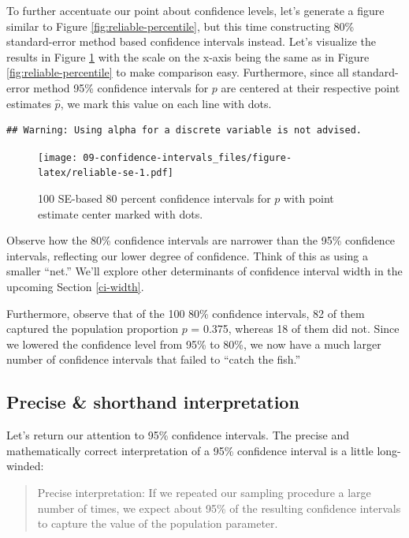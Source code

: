 \documentclass[
]{book}
\begin{document}
To further accentuate our point about confidence levels, let's generate a figure similar to Figure \ref{fig:reliable-percentile}, but this time constructing 80\% standard-error method based confidence intervals instead. Let's visualize the results in Figure \ref{fig:reliable-se} with the scale on the x-axis being the same as in Figure \ref{fig:reliable-percentile} to make comparison easy. Furthermore, since all standard-error method 95\% confidence intervals for \(p\) are centered at their respective point estimates \(\widehat{p}\), we mark this value on each line with dots.

\begin{verbatim}
## Warning: Using alpha for a discrete variable is not advised.
\end{verbatim}

\begin{figure}
\centering
\texttt{[image: 09-confidence-intervals\_files/figure-latex/reliable-se-1.pdf]}
\caption{\label{fig:reliable-se}100 SE-based 80 percent confidence intervals for \(p\) with point estimate center marked with dots.}
\end{figure}

Observe how the 80\% confidence intervals are narrower than the 95\% confidence intervals, reflecting our lower degree of confidence. Think of this as using a smaller ``net.'' We'll explore other determinants of confidence interval width in the upcoming Section \ref{ci-width}.

Furthermore, observe that of the 100 80\% confidence intervals, 82 of them captured the population proportion \(p\) = 0.375, whereas 18 of them did not. Since we lowered the confidence level from 95\% to 80\%, we now have a much larger number of confidence intervals that failed to ``catch the fish.''

\hypertarget{shorthand}{%
\subsection{Precise \& shorthand interpretation}\label{shorthand}}


Let's return our attention to 95\% confidence intervals. The precise and mathematically correct interpretation of a 95\% confidence interval is a little long-winded:

\begin{quote}
Precise interpretation: If we repeated our sampling procedure a large number of times, we expect about 95\% of the resulting confidence intervals to capture the value of the population parameter.
\end{quote}
\end{document}
